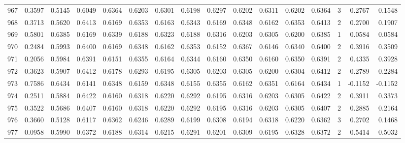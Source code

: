 \begin{tabular}{lrrrrrrrrrrrrrrr}
967 &      0.3597 &  0.5145 &  0.6049 &  0.6364 &  0.6203 &  0.6301 &  0.6198 &  0.6297 &  0.6202 &  0.6311 &   0.6202 &     0.6364 &      3 &                    0.2767 &                     0.1548 \\
968 &      0.3713 &  0.5620 &  0.6413 &  0.6169 &  0.6353 &  0.6163 &  0.6343 &  0.6169 &  0.6348 &  0.6162 &   0.6353 &     0.6413 &      2 &                    0.2700 &                     0.1907 \\
969 &      0.5801 &  0.6385 &  0.6169 &  0.6339 &  0.6188 &  0.6323 &  0.6188 &  0.6316 &  0.6203 &  0.6305 &   0.6200 &     0.6385 &      1 &                    0.0584 &                     0.0584 \\
970 &      0.2484 &  0.5993 &  0.6400 &  0.6169 &  0.6348 &  0.6162 &  0.6353 &  0.6152 &  0.6367 &  0.6146 &   0.6340 &     0.6400 &      2 &                    0.3916 &                     0.3509 \\
971 &      0.2056 &  0.5984 &  0.6391 &  0.6151 &  0.6355 &  0.6164 &  0.6344 &  0.6160 &  0.6350 &  0.6160 &   0.6350 &     0.6391 &      2 &                    0.4335 &                     0.3928 \\
972 &      0.3623 &  0.5907 &  0.6412 &  0.6178 &  0.6293 &  0.6195 &  0.6305 &  0.6203 &  0.6305 &  0.6200 &   0.6304 &     0.6412 &      2 &                    0.2789 &                     0.2284 \\
973 &      0.7586 &  0.6434 &  0.6141 &  0.6348 &  0.6159 &  0.6348 &  0.6155 &  0.6355 &  0.6162 &  0.6351 &   0.6164 &     0.6434 &      1 &                   -0.1152 &                    -0.1152 \\
974 &      0.2511 &  0.5884 &  0.6422 &  0.6160 &  0.6318 &  0.6220 &  0.6292 &  0.6195 &  0.6316 &  0.6203 &   0.6305 &     0.6422 &      2 &                    0.3911 &                     0.3373 \\
975 &      0.3522 &  0.5686 &  0.6407 &  0.6160 &  0.6318 &  0.6220 &  0.6292 &  0.6195 &  0.6316 &  0.6203 &   0.6305 &     0.6407 &      2 &                    0.2885 &                     0.2164 \\
976 &      0.3660 &  0.5128 &  0.6117 &  0.6362 &  0.6246 &  0.6289 &  0.6199 &  0.6308 &  0.6194 &  0.6318 &   0.6220 &     0.6362 &      3 &                    0.2702 &                     0.1468 \\
977 &      0.0958 &  0.5990 &  0.6372 &  0.6188 &  0.6314 &  0.6215 &  0.6291 &  0.6201 &  0.6309 &  0.6195 &   0.6328 &     0.6372 &      2 &                    0.5414 &                     0.5032 \\

\end{tabular}
